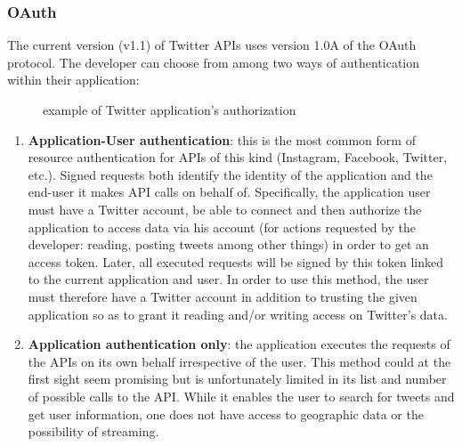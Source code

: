\documentclass[a4paper,11pt]{report}
\begin{document}
\subsubsection{OAuth}
The current version (v1.1) of Twitter APIs uses version 1.0A of the OAuth protocol. The developer can choose from among two ways of authentication within their application:
\begin{figure}
\vspace{2pt}
\begin{center}
\caption{example of Twitter application's authorization}
\end{center}
\vspace{-32pt}
\end{figure}

\begin{enumerate}
	\item \textbf{Application-User authentication}: this is the most common form of resource authentication for APIs of this kind (Instagram, Facebook, Twitter, etc.). Signed requests both identify the identity of the application and the end-user it makes API calls on behalf of.
Specifically, the application user must have a Twitter account, be able to connect and then authorize the application to access data via his account (for actions requested by the developer: reading, posting tweets among other things) in order to get an access token. Later, all executed requests will be signed by this token linked to the current application and user.
In order to use this method, the user must therefore have a Twitter account in addition to trusting the given application so as to grant it reading and/or writing access on Twitter's data.
\end{enumerate}

\begin{enumerate}
	\setcounter{enumi}{1}
	\item \textbf{Application authentication only}: the application executes the requests of the APIs on its own behalf irrespective of the user. This method could at the first sight seem promising but is unfortunately limited in its list and number of possible calls to the API. While it enables the user to search for tweets and get user information, one does not have access to geographic data or the possibility of streaming.
\end{enumerate}
\end{document}
